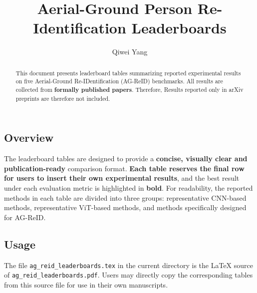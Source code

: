 \documentclass[runningheads]{llncs}
\title{Aerial-Ground Person Re-Identification Leaderboards}
\author{Qiwei Yang\orcidlink{0009-0007-3730-0903}}
\institute{Dalian University of Technology, Dalian, China\\
  \email{dutyqw@mail.dlut.edu.cn}}
\begin{document}
\pagestyle{empty}

\maketitle

\begin{abstract}
  \sloppy
  This document presents leaderboard tables summarizing reported experimental results on five Aerial-Ground Re-IDentification (AG-ReID) benchmarks.
  All results are collected from \textbf{formally published papers}.
  Therefore, Results reported only in arXiv preprints are therefore not included.
\end{abstract}

\subsection*{Overview}
\sloppy
The leaderboard tables are designed to provide a \textbf{concise, visually clear and publication-ready} comparison format.
\textbf{Each table reserves the final row for users to insert their own experimental results}, and the best result under each evaluation metric is highlighted in \textbf{bold}.
For readability, the reported methods in each table are divided into three groups: representative CNN-based methods, representative ViT-based methods, and methods specifically designed for AG-ReID.
\subsection*{Usage}
The file \texttt{ag\_reid\_leaderboards.tex} in the current directory is the \LaTeX{} source of \texttt{ag\_reid\_leaderboards.pdf}.
Users may directly copy the corresponding tables from this source file for use in their own manuscripts.
\end{document}
